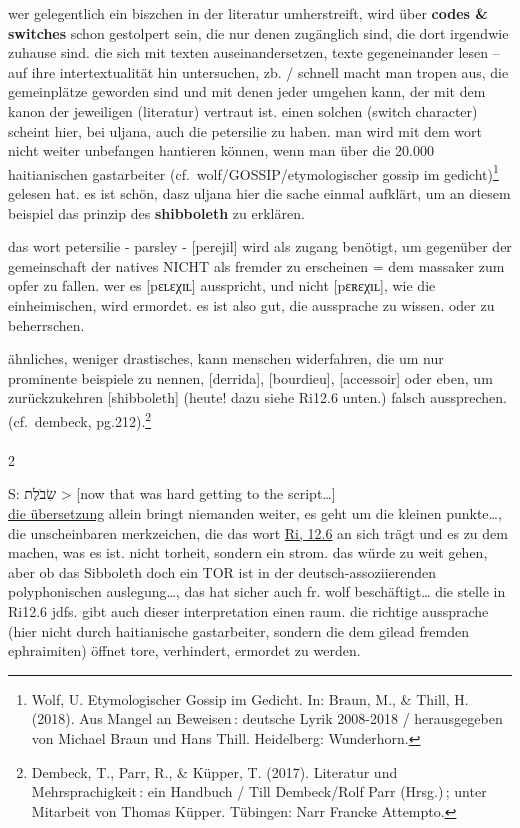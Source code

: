 \documentclass[
  letterpaper,
  DIV=11,
  numbers=noendperiod]{scrartcl}
\makeatletter
\let\oldparagraph\paragraph
\renewcommand{\paragraph}{
    \@ifstar
      \xxxParagraphStar
      \xxxParagraphNoStar
  }
\newcommand{\xxxParagraphStar}[1]{\oldparagraph*{#1}\mbox{}}
\newcommand{\xxxParagraphNoStar}[1]{\oldparagraph{#1}\mbox{}}
\makeatother
\begin{document}
wer gelegentlich ein biszchen in der literatur umherstreift, wird über
\textbf{codes \& switches} schon gestolpert sein, die nur denen
zugänglich sind, die dort irgendwie zuhause sind. die sich mit texten
auseinandersetzen, texte gegeneinander lesen -- auf ihre
intertextualität hin untersuchen, zb. / schnell macht man tropen aus,
die gemeinplätze geworden sind und mit denen jeder umgehen kann, der mit
dem kanon der jeweiligen (literatur) vertraut ist. einen solchen (switch
character) scheint hier, bei uljana, auch die petersilie zu haben. man
wird mit dem wort nicht weiter unbefangen hantieren können, wenn man
über die 20.000 haitianischen gastarbeiter
(cf.~wolf/GOSSIP/etymologischer gossip im gedicht)\footnote{Wolf, U.
  Etymologischer Gossip im Gedicht. In: Braun, M., \& Thill, H. (2018).
  Aus Mangel an Beweisen\,: deutsche Lyrik 2008-2018 / herausgegeben von
  Michael Braun und Hans Thill. Heidelberg: Wunderhorn.} gelesen hat. es
ist schön, dasz uljana hier die sache einmal aufklärt, um an diesem
beispiel das prinzip des \textbf{shibboleth} zu erklären.

das wort petersilie - parsley - {[}perejil{]} wird als zugang benötigt,
um gegenüber der gemeinschaft der natives NICHT als fremder zu
erscheinen = dem massaker zum opfer zu fallen. wer es
{[}p{\ipafont ɛʟɛ}χ{\ipafont ɪʟ}{]} ausspricht, und nicht
{[}p{\ipafont ɛʀɛ}χ{\ipafont ɪʟ}{]}, wie die einheimischen, wird
ermordet. es ist also gut, die aussprache zu wissen. oder zu
beherrschen.

ähnliches, weniger drastisches, kann menschen widerfahren, die um nur
prominente beispiele zu nennen, {[}derrida{]}, {[}bourdieu{]},
{[}accessoir{]} oder eben, um zurückzukehren {[}shibboleth{]} (heute!
dazu siehe Ri12.6 unten.) falsch aussprechen. (cf.~dembeck,
pg.212).\footnote{Dembeck, T., Parr, R., \& Küpper, T. (2017). Literatur
  und Mehrsprachigkeit\,: ein Handbuch / Till Dembeck/Rolf Parr
  (Hrsg.)\,; unter Mitarbeit von Thomas Küpper. Tübingen: Narr Francke
  Attempto.}

\paragraph{2}\label{section-1}

S: שִׂבֹלֶת \textgreater{} {[}now that was hard getting to the
script\ldots{]}\\
\href{https://www.pealim.com/dict/3270-shibolet/}{die übersetzung}
allein bringt niemanden weiter, es geht um die kleinen punkte\ldots, die
unscheinbaren merkzeichen, die das wort
\href{https://www.sefaria.org/Judges.12.6?lang=bi&with=all&lang2=en}{Ri,
12.6} an sich trägt und es zu dem machen, was es ist. nicht torheit,
sondern ein strom. das würde zu weit gehen, aber ob das Sibboleth doch
ein TOR ist in der deutsch-assoziierenden polyphonischen
auslegung\ldots, das hat sicher auch fr. wolf beschäftigt\ldots{} die
stelle in Ri12.6 jdfs. gibt auch dieser interpretation einen raum. die
richtige aussprache (hier nicht durch haitianische gastarbeiter, sondern
die dem gilead fremden ephraimiten) öffnet tore, verhindert, ermordet zu
werden.
\end{document}
